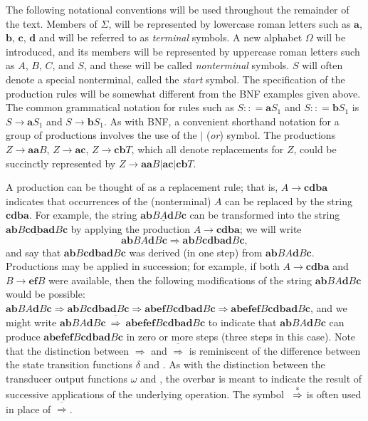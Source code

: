 The following notational conventions will be used throughout the remainder of
the text. Members of $\Sigma$, will be represented by lowercase roman letters
such as $\pmb{a}$, $\pmb{b}$, $\pmb{c}$, $\pmb{d}$ and will be referred to as
\emph{terminal} symbols. A new alphabet $\Omega$ will be introduced, and its
members will be represented by uppercase roman letters such as $A$, $B$, $C$,
and $S$, and these will be called \emph{nonterminal} symbols. $S$ will often
denote a special nonterminal, called the \emph{start} symbol. The specification
of the production rules will be somewhat different from the BNF
examples given above. The common grammatical notation for rules such as $S:: =
\pmb{a}S_1$ and $S:: = \pmb{b}S_1$ is $S \rightarrow \pmb{a}S_1$ and $S
\rightarrow \pmb{b}S_1$. As with BNF, a convenient shorthand notation for a
group of productions involves the use of the $|$ (\emph{or}) symbol. The
productions $Z \rightarrow \pmb{aa}B$, $Z \rightarrow \pmb{ac}$, $Z \rightarrow
\pmb{cb}T$, which all denote replacements for $Z$, could be succinctly
represented by $Z \rightarrow \pmb{aa}B|\pmb{ac}|\pmb{cb}T.$

A production can be thought of as a replacement rule; that is, $A \rightarrow
\pmb{cdba}$ indicates that occurrences of the (nonterminal) $A$ can be replaced
by the string $\pmb{cdba}$. For example, the string $\pmb{ab}B\underline{A}\pmb{d}B\pmb{c}$ can
be transformed into the string $\pmb{ab}B\pmb{\underline{cdba}d}B\pmb{c}$ by applying the
production $A \rightarrow \pmb{cdba}$; we will write
\[ \pmb{ab}BA\pmb{d}B\pmb{c} \Rightarrow \pmb{ab}B\pmb{cdbad}B\pmb{c}, \]
and say that $\pmb{ab}B\pmb{cdbad}B\pmb{c}$ was derived (in one step) from $\pmb{ab}BA\pmb{d}B\pmb{c}$.
Productions may be applied in succession; for example, if both $A \rightarrow
\pmb{cdba}$ and $B \rightarrow \pmb{ef}B$ were available, then the following
modifications of the string $\pmb{ab}BA\pmb{d}B\pmb{c}$ would be possible: $\pmb{ab}BA\pmb{d}B\pmb{c}
\Rightarrow \pmb{ab}B\pmb{cdbad}B\pmb{c} \Rightarrow \pmb{abef}B\pmb{cdbad}B\pmb{c} \Rightarrow
\pmb{abefef}B\pmb{cdbad}B\pmb{c}$, and we might write $\pmb{ab}BA\pmb{d}B\pmb{c} \  \overline{\Rightarrow} \ 
\pmb{abefef}B\pmb{cdbad}B\pmb{c}$ to indicate that $\pmb{ab}BA\pmb{d}B\pmb{c}$ can produce $\pmb{
abefef}B\pmb{cdbad}B\pmb{c}$ in zero or more steps (three steps in this case). Note that the
distinction between $\Rightarrow$ and $\overline{\Rightarrow}$ is reminiscent of
the difference between the state transition functions $\delta$ and \DBAR. As
with the distinction between the transducer output functions $\omega$ and \OBAR,
the overbar is meant to indicate the result of successive applications of the
underlying operation. The symbol \  $\operatorname{\overset{*}{\Rightarrow}}$ is often used in place
of $\overline{\Rightarrow}$.


